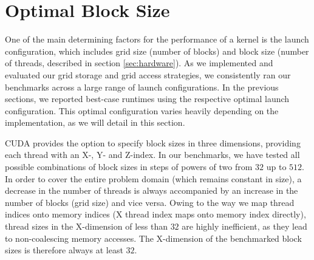 \section{Optimal Block Size} \label{sec:res-blocksize}



One of the main determining factors for the performance of a kernel is the launch configuration, which includes grid size (number of blocks) and block size (number of threads, described in section \ref{sec:hardware}). As we implemented and evaluated our grid storage and grid access strategies, we consistently ran our benchmarks across a large range of launch configurations. In the previous sections, we reported best-case runtimes using the respective optimal launch configuration. This optimal configuration varies heavily depending on the implementation, as we will detail in this section.

CUDA provides the option to specify block sizes in three dimensions, providing each thread with an X-, Y- and Z-index. In our benchmarks, we have tested all possible combinations of block sizes in steps of powers of two from $32$ up to $512$. In order to cover the entire problem domain (which remains constant in size), a decrease in the number of threads is always accompanied by an increase in the number of blocks (grid size) and vice versa. Owing to the way we map thread indices onto memory indices (X thread index maps onto memory index directly), thread sizes in the X-dimension of less than $32$ are highly inefficient, as they lead to non-coalescing memory accesses. The X-dimension of the benchmarked block sizes is therefore always at least $32$.

